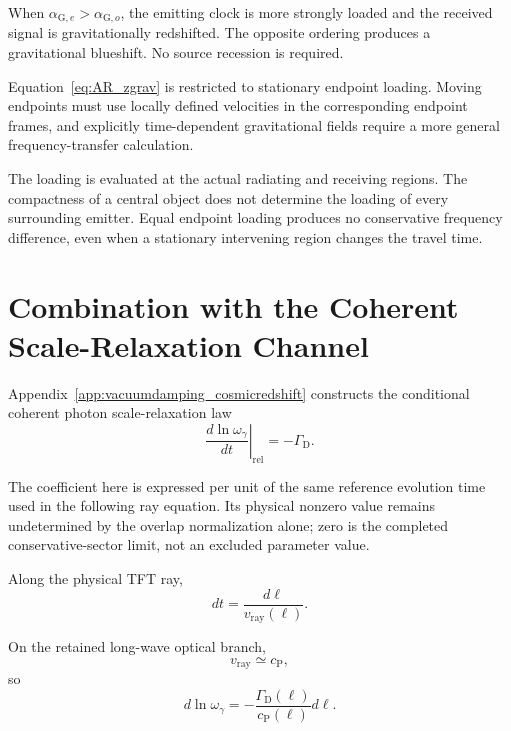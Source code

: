 When
\(\alpha_{\mathrm G,e}>\alpha_{\mathrm G,o}\),
the emitting clock is more strongly loaded and the received signal is
gravitationally redshifted. The opposite ordering produces a gravitational
blueshift. No source recession is required.

Equation~\eqref{eq:AR_zgrav} is restricted to stationary endpoint loading.
Moving endpoints must use locally defined velocities in the corresponding
endpoint frames, and explicitly time-dependent gravitational fields require a
more general frequency-transfer calculation.

The loading is evaluated at the actual radiating and receiving regions.
The compactness of a central object does not determine the loading of every
surrounding emitter. Equal endpoint loading produces no conservative
frequency difference, even when a stationary intervening region changes the
travel time.


\section{Combination with the Coherent Scale-Relaxation Channel}

Appendix~\ref{app:vacuumdamping_cosmicredshift} constructs the conditional
coherent photon scale-relaxation law
\begin{equation}
    \left.
    \frac{
        d\ln\omega_{\gamma}
    }{
        dt
    }
    \right|_{\mathrm{rel}}
    =
    -\Gamma_{\mathrm D}.
    \label{eq:AR_AQ_local}
\end{equation}

The coefficient here is expressed per unit of the same reference evolution
time used in the following ray equation. Its physical nonzero value remains
undetermined by the overlap normalization alone; zero is the completed
conservative-sector limit, not an excluded parameter value.

Along the physical TFT ray,
\begin{equation}
    dt
    =
    \frac{d\ell}{v_{\mathrm{ray}}(\ell)}.
\end{equation}

On the retained long-wave optical branch,
\begin{equation}
    v_{\mathrm{ray}}
    \simeq
    c_{\mathrm P},
\end{equation}
so
\begin{equation}
    d\ln\omega_{\gamma}
    =
    -
    \frac{
        \Gamma_{\mathrm D}(\ell)
    }{
        c_{\mathrm P}(\ell)
    }
    d\ell.
\end{equation}

